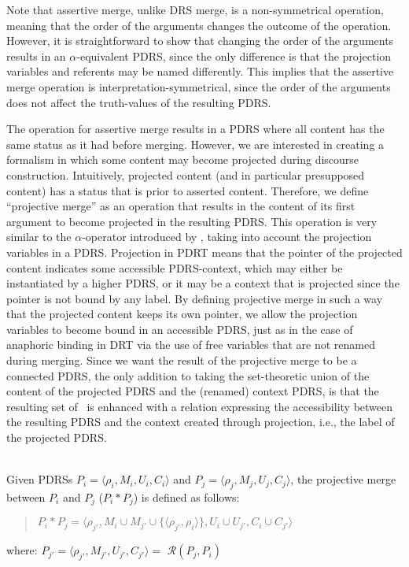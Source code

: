 \noindent Note that assertive merge, unlike DRS merge, is a non-symmetrical
operation, meaning that the order of the arguments changes the outcome of
the operation. However, it is straightforward to show that changing the
order of the arguments results in an $\alpha$-equivalent PDRS, since the
only difference is that the projection variables and referents may be named
differently. This implies that the assertive merge operation is
interpretation-symmetrical, since the order of the arguments does not affect
the truth-values of the resulting PDRS.

The operation for assertive merge results in a PDRS where all content has
the same status as it had before merging. However, we are interested in
creating a formalism in which some content may become projected during
discourse construction.  Intuitively, projected content (and in particular
presupposed content) has a status that is prior to asserted content.
Therefore, we define ``projective merge'' as an operation that results in
the content of its first argument to become projected in the resulting PDRS.
This operation is very similar to the $\alpha$-operator introduced by
\cite{bos2003implementing}, taking into account the projection variables in
a PDRS. Projection in PDRT means that the pointer of the projected content
indicates some accessible PDRS-context, which may either be instantiated by
a higher PDRS, or it may be a context that is projected since the pointer is
not bound by any label. By defining projective merge in such a way that the
projected content keeps its own pointer, we allow the projection variables
to become bound in an accessible PDRS, just as in the case of anaphoric
binding in DRT via the use of free variables that are not renamed during
merging. Since we want the result of the projective merge to be a connected
PDRS, the only addition to taking the set-theoretic union of the content of
the projected PDRS and the (renamed) context PDRS, is that the resulting set
of \MAPs~is enhanced with a relation expressing the accessibility between
the resulting PDRS and the context created through projection, i.e.,
the label of the projected PDRS.

\begin{definition}~\\
Given PDRSs $P_i=\langle \rho_i,M_i,U_i,C_i \rangle$ and 
$P_j=\langle \rho_j,M_j,U_j,C_j\rangle$, the projective merge between $P_i$
and $P_j$ ($P_i \ast P_j$) is defined as follows:
  \begin{quote}
    $P_i \ast P_j = 
      \langle \rho_{j'}, 
        M_{i}\cup M_{j'}\cup\{\langle\rho_{j'},\rho_{i}\rangle\}, 
        U_{i}\cup U_{j'},C_{i} \cup C_{j'}\rangle$
  \end{quote}
  where: $P_{j'} = \langle \rho_{j'}, M_{j'}, U_{j'}, C_{j'} \rangle =$ 
      $\mathcal{R}(P_j,P_i)$
\end{definition}

